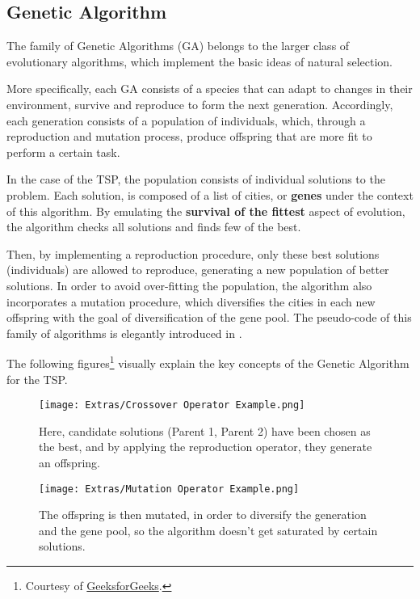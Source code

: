 \subsection{Genetic Algorithm}
\label{subsec: GA}

The family of Genetic Algorithms (GA) belongs to the larger class of evolutionary algorithms, which implement the basic ideas of natural selection.

More specifically, each GA consists of a species that can adapt to changes in their environment, survive and reproduce to form the next generation. Accordingly, each generation consists of a population of individuals, which, through a reproduction and mutation process, produce offspring that are more fit to perform a certain task.

In the case of the TSP, the population consists of individual solutions to the problem. Each solution, is composed of a list of cities, or \textbf{genes} under the context of this algorithm. By emulating the \textbf{survival of the fittest} aspect of evolution, the algorithm checks all solutions and finds few of the best.

Then, by implementing a reproduction procedure, only these best solutions (individuals) are allowed to reproduce, generating a new population of better solutions. In order to avoid over-fitting the population, the algorithm also incorporates a mutation procedure, which diversifies the cities in each new offspring with the goal of diversification of the gene pool. The pseudo-code of this family of algorithms is elegantly introduced in \cite{liu2018greedy}.

The following figures\footnote{Courtesy of \href{https://www.geeksforgeeks.org/genetic-algorithms/}{GeeksforGeeks}.} visually explain the key concepts of the Genetic Algorithm for the TSP.

\begin{figure}[htbp]
	\centering
	\texttt{[image: Extras/Crossover Operator Example.png]}
	\caption{Here, candidate solutions (Parent 1, Parent 2) have been chosen as the best, and by applying the reproduction operator, they generate an offspring.}
	\label{fig: crossover}
\end{figure}

\begin{figure}[htbp]
	\centering
	\texttt{[image: Extras/Mutation Operator Example.png]}
	\caption{The offspring is then mutated, in order to diversify the generation and the gene pool, so the algorithm doesn't get saturated by certain solutions.}
	\label{fig: mutation}
\end{figure}


